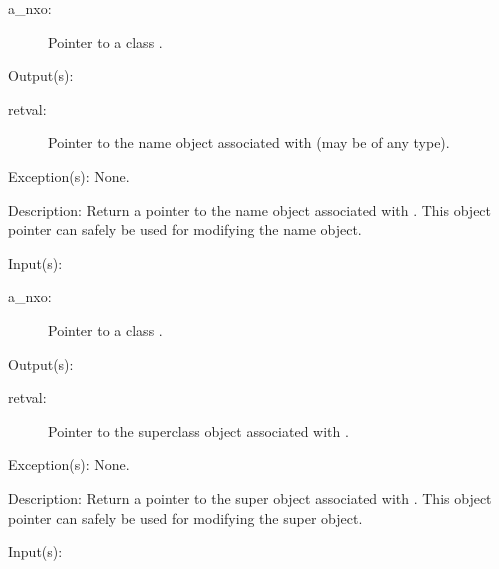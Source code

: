 \begin{capi}
\begin{capilist}
		\begin{description}\item[]
		\item[a\_nxo: ]
			Pointer to a class .
		\end{description}
	\item[Output(s): ]
		\begin{description}\item[]
		\item[retval: ]
			Pointer to the name object associated with 
			(may be of any type).
		\end{description}
	\item[Exception(s): ] None.
	\item[Description: ]
		Return a pointer to the name object associated with
		.  This object pointer can safely be used for
		modifying the name object.
	\end{capilist}
\label{nxo_class_super_get}
	\begin{capilist}
	\item[Input(s): ]
		\begin{description}\item[]
		\item[a\_nxo: ]
			Pointer to a class .
		\end{description}
	\item[Output(s): ]
		\begin{description}\item[]
		\item[retval: ]
			Pointer to the superclass object associated with
			.
		\end{description}
	\item[Exception(s): ] None.
	\item[Description: ]
		Return a pointer to the super object associated with
		.  This object pointer can safely be used for
		modifying the super object.
	\end{capilist}
\label{nxo_class_methods_get}
	\begin{capilist}
	\item[Input(s): ]
		\begin{description}\item[]

\end{description}
\end{capilist}
\end{capi}
